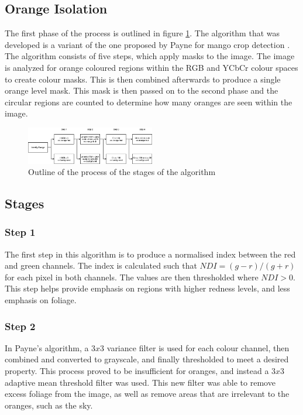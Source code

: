 \documentclass[conference]{IEEEtran}
\begin{document}
\subsection{Orange Isolation}

The first phase of the process is outlined in figure \ref{fig:algoOverview}. The algorithm that was developed is a variant of the one proposed by Payne for mango crop detection  \cite{payne_estimation_2013}. The algorithm consists of five steps, which apply masks to the image. The image is analyzed for orange coloured regions within the RGB and YCbCr colour spaces to create colour masks. This is then combined afterwards to produce a single orange level mask.  This mask is then passed on to the second phase and the circular regions are counted to determine how many oranges are seen within the image.

\begin{figure}[H]
\centerline{\includegraphics[width=0.5\textwidth]{algo_stages}}
\caption{Outline of the process of the stages of the algorithm}
\label{fig:algoOverview}
\end{figure}

\subsection{Stages}

\subsubsection{Step 1}
The first step in this algorithm is to produce a normalised index between the red and green channels. The index is calculated such that $NDI = (g - r) / (g + r)$ for each pixel in both channels. The values are then thresholded where $NDI > 0$. This step helps provide emphasis on regions with higher redness levels, and less emphasis on foliage.

\subsubsection{Step 2}
In Payne’s algorithm, a $3x3$ variance filter is used for each colour channel, then combined and converted to grayscale, and finally thresholded to meet a desired property. This process proved to be insufficient for oranges, and instead a $3x3$ adaptive mean threshold filter was used. This new filter was able to remove excess foliage from the image, as well as remove areas that are irrelevant to the oranges, such as the sky.
\end{document}
